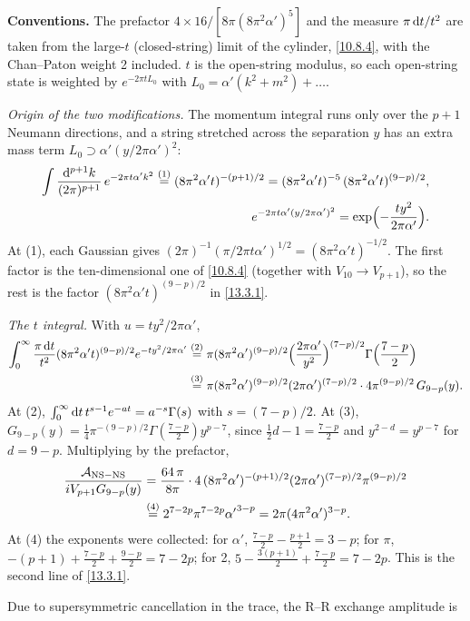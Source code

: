 \begin{tcolorbox}[breakable]
	\begin{remark}
		\textbf{Conventions.} The prefactor $4\times16/[8\pi(8\pi^2\alpha')^5]$ and the measure $\pi\,\mathrm{d} t/t^2$ are taken from the large-$t$ (closed-string) limit of the cylinder, \eqref{10.8.4}, with the Chan--Paton weight 2 included. $t$ is the open-string modulus, so each open-string state is weighted by $e^{-2\pi tL_0}$ with $L_0=\alpha'(k^2+m^2)+\dots$.

		\textit{Origin of the two modifications.} The momentum integral runs only over the $p+1$ Neumann directions, and a string stretched across the separation $y$ has an extra mass term $L_0\supset\alpha'(y/2\pi\alpha')^2$:
		\begin{align*}
			\int\frac{\mathrm{d}^{p+1}k}{(2\pi)^{p+1}}\,e^{-2\pi t\alpha'k^2} \overset{(1)}{=} (8\pi^2\alpha't)^{-(p+1)/2} = (8\pi^2\alpha't)^{-5}\,(8\pi^2\alpha't)^{(9-p)/2},\\
			e^{-2\pi t\alpha'(y/2\pi\alpha')^2} = \exp\Bigl(-\frac{ty^2}{2\pi\alpha'}\Bigr).
		\end{align*}
		At (1), each Gaussian gives $(2\pi)^{-1}(\pi/2\pi t\alpha')^{1/2}=(8\pi^2\alpha't)^{-1/2}$. The first factor is the ten-dimensional one of \eqref{10.8.4} (together with $V_{10}\to V_{p+1}$), so the rest is the factor $(8\pi^2\alpha't)^{(9-p)/2}$ in \eqref{13.3.1}.

		\textit{The $t$ integral.} With $u=ty^2/2\pi\alpha'$,
		\begin{align*}
			\int_0^\infty \frac{\pi\,\mathrm{d} t}{t^2}(8\pi^2\alpha't)^{(9-p)/2}e^{-ty^2/2\pi\alpha'}
			&\overset{(2)}{=} \pi(8\pi^2\alpha')^{(9-p)/2}\Bigl(\frac{2\pi\alpha'}{y^2}\Bigr)^{(7-p)/2}\Gamma\Bigl(\frac{7-p}{2}\Bigr)\\
			&\overset{(3)}{=} \pi(8\pi^2\alpha')^{(9-p)/2}(2\pi\alpha')^{(7-p)/2}\cdot 4\pi^{(9-p)/2}\,G_{9-p}(y) .
		\end{align*}
		At (2), $\int_0^\infty\mathrm{d} t\,t^{s-1}e^{-at}=a^{-s}\Gamma(s)$ with $s=(7-p)/2$. At (3), $G_{9-p}(y)=\frac14\pi^{-(9-p)/2}\Gamma(\frac{7-p}{2})y^{p-7}$, since $\frac12 d-1=\frac{7-p}{2}$ and $y^{2-d}=y^{p-7}$ for $d=9-p$. Multiplying by the prefactor,
		\begin{align*}
			\frac{\mathcal A_{\rm NS-NS}}{i V_{p+1}G_{9-p}(y)} &= \frac{64\,\pi}{8\pi}\cdot4\,(8\pi^2\alpha')^{-(p+1)/2}(2\pi\alpha')^{(7-p)/2}\pi^{(9-p)/2}\\
			&\overset{(4)}{=} 2^{7-2p}\pi^{7-2p}{\alpha'}^{3-p} = 2\pi(4\pi^2\alpha')^{3-p} .
		\end{align*}
		At (4) the exponents were collected: for $\alpha'$, $\frac{7-p}{2}-\frac{p+1}{2}=3-p$; for $\pi$, $-(p+1)+\frac{7-p}{2}+\frac{9-p}{2}=7-2p$; for 2, $5-\frac{3(p+1)}{2}+\frac{7-p}{2}=7-2p$. This is the second line of \eqref{13.3.1}.
	\end{remark}
\end{tcolorbox} Due to supersymmetric cancellation in the trace, the R--R exchange amplitude is
